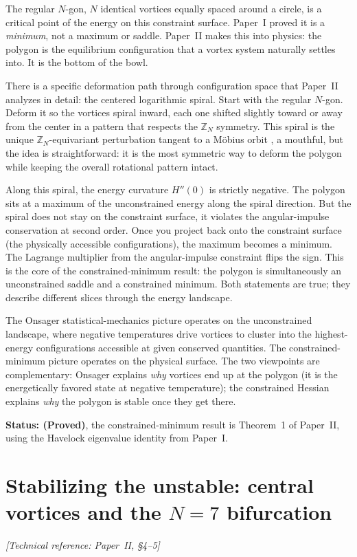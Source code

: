 The regular $N$-gon, $N$ identical vortices equally spaced around a
circle, is a critical point of the energy on this constraint surface.
Paper~I proved it is a \emph{minimum}, not a maximum or saddle. Paper~II
makes this into physics: the polygon is the equilibrium configuration
that a vortex system naturally settles into. It is the bottom of the
bowl.

There is a specific deformation path through configuration space that
Paper~II analyzes in detail: the centered logarithmic spiral. Start
with the regular $N$-gon. Deform it so the vortices spiral inward,
each one shifted slightly toward or away from the center in a pattern
that respects the $\mathbb{Z}_N$ symmetry. This spiral is the unique
$\mathbb{Z}_N$-equivariant perturbation tangent to a M\"obius orbit
, a mouthful, but the idea is straightforward: it is the most
symmetric way to deform the polygon while keeping the overall rotational
pattern intact.

Along this spiral, the energy curvature $H''(0)$ is strictly negative.
The polygon sits at a maximum of the unconstrained energy along the
spiral direction. But the spiral does not stay on the constraint
surface, it violates the angular-impulse conservation at second order.
Once you project back onto the constraint surface (the physically
accessible configurations), the maximum becomes a minimum. The
Lagrange multiplier from the angular-impulse constraint flips the sign.
This is the core of the constrained-minimum result: the polygon is
simultaneously an unconstrained saddle and a constrained minimum. Both
statements are true; they describe different slices through the energy
landscape.

The Onsager statistical-mechanics picture operates on the unconstrained
landscape, where negative temperatures drive vortices to cluster into
the highest-energy configurations accessible at given conserved
quantities. The constrained-minimum picture operates on the physical
surface. The two viewpoints are complementary: Onsager explains
\emph{why} vortices end up at the polygon (it is the energetically
favored state at negative temperature); the constrained Hessian
explains \emph{why} the polygon is stable once they get there.

\textbf{Status: (Proved)}, the constrained-minimum result is
Theorem~1 of Paper~II, using the Havelock eigenvalue identity from
Paper~I.


\section{Stabilizing the unstable: central vortices and the
\texorpdfstring{$N=7$}{N=7} bifurcation}
\noindent\textit{[Technical reference: Paper~II, \S4--5]}

